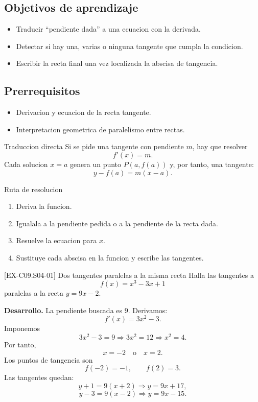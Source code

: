 \subsection*{Objetivos de aprendizaje}
\begin{itemize}
  \item Traducir ``pendiente dada'' a una ecuacion con la derivada.
  \item Detectar si hay una, varias o ninguna tangente que cumpla la condicion.
  \item Escribir la recta final una vez localizada la abscisa de tangencia.
\end{itemize}

\subsection*{Prerrequisitos}
\begin{itemize}
  \item Derivacion y ecuacion de la recta tangente.
  \item Interpretacion geometrica de paralelismo entre rectas.
\end{itemize}

\begin{theorybox}{Traduccion directa}
Si se pide una tangente con pendiente \(m\), hay que resolver
\[
f'(x)=m.
\]
Cada solucion \(x=a\) genera un punto \(P(a,f(a))\) y, por tanto, una tangente:
\[
y-f(a)=m(x-a).
\]
\end{theorybox}

\begin{methodbox}{Ruta de resolucion}
\begin{enumerate}
  \item Deriva la funcion.
  \item Igualala a la pendiente pedida o a la pendiente de la recta dada.
  \item Resuelve la ecuacion para \(x\).
  \item Sustituye cada abscisa en la funcion y escribe las tangentes.
\end{enumerate}
\end{methodbox}

\begin{solvedexample}{[EX-C09.S04-01] Dos tangentes paralelas a la misma recta}
Halla las tangentes a
\[
f(x)=x^3-3x+1
\]
paralelas a la recta \(y=9x-2\).

\textbf{Desarrollo.} La pendiente buscada es \(9\). Derivamos:
\[
f'(x)=3x^2-3.
\]
Imponemos
\[
3x^2-3=9 \Longrightarrow 3x^2=12 \Longrightarrow x^2=4.
\]
Por tanto,
\[
x=-2 \quad \text{o} \quad x=2.
\]
Los puntos de tangencia son
\[
f(-2)=-1,\qquad f(2)=3.
\]
Las tangentes quedan:
\[
y+1=9(x+2)\Longrightarrow y=9x+17,
\]
\[
y-3=9(x-2)\Longrightarrow y=9x-15.
\]
\end{solvedexample}

